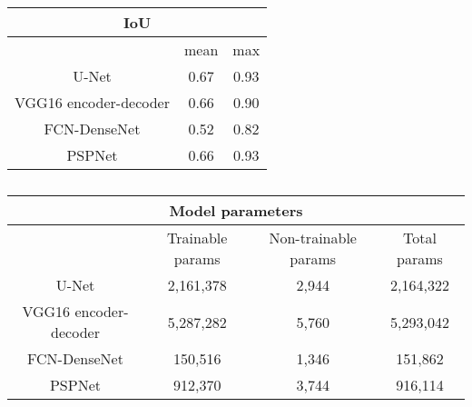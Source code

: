 %

%	

\begin{table}[]
	\centering
	\caption{}
	\label{tab:table_iou}
	\begin{tabular}{ccc}
		\multicolumn{3}{c}{IoU} \\ \hline
		& mean & max \\ \hline
		U-Net & 0.67 & 0.93 \\ \hline
		VGG16 encoder-decoder & 0.66 & 0.90 \\ \hline
		FCN-DenseNet & 0.52 & 0.82 \\ \hline
		PSPNet & 0.66 & 0.93 \\ \hline
	\end{tabular}
	
\end{table}

\begin{table}[]
	\centering
	\caption{}
	\label{tab:table_parameters}
	\resizebox{\textwidth}{!}
	{
		\begin{tabular}{cccc}
			\multicolumn{4}{c}{Model parameters} \\ \hline
			& Trainable params & Non-trainable params & Total params \\ \hline
			U-Net & 2,161,378 & 2,944 & 2,164,322 \\ \hline
			VGG16 encoder-decoder & 5,287,282 & 5,760 & 5,293,042 \\ \hline
			FCN-DenseNet & 150,516 & 1,346 & 151,862 \\ \hline
			PSPNet & 912,370 & 3,744 & 916,114 \\ \hline
		\end{tabular}
	}

\end{table}

